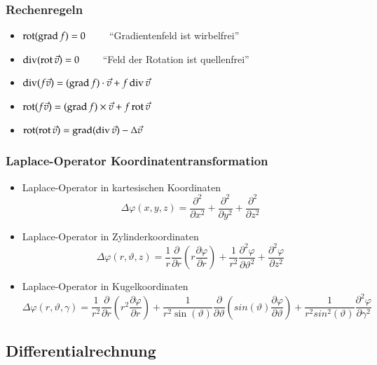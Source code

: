 \subsubsection{Rechenregeln}
\begin{itemize}
	\item $\operatorname{rot}(\operatorname{grad} f) = 0 \qquad $ ``Gradientenfeld ist wirbelfrei''
	\item $\operatorname{div}(\operatorname{rot} \vec{v}) = 0 \qquad $ ``Feld der Rotation ist quellenfrei''
	\item $\operatorname{div}(f\vec{v}) = (\operatorname{grad} f) \cdot \vec{v} + f \operatorname{div} \vec{v}$
	\item $\operatorname{rot}(f\vec{v}) = (\operatorname{grad} f) \times \vec{v} + f \operatorname{rot} \vec{v}$
	\item $\operatorname{rot}(\operatorname{rot} \vec{v}) = \operatorname{grad}(\operatorname{div} \vec{v}) - \Delta \vec{v}$
\end{itemize}
\subsubsection{Laplace-Operator Koordinatentransformation}
\begin{itemize}
	\item Laplace-Operator in kartesischen Koordinaten
	\[\Delta \varphi(x,y,z) = \frac{\partial^{2}}{\partial x^{2}}+\frac{\partial^{2}}{\partial y^{2}}+\frac{\partial^{2}}{\partial z^{2}}\]
	\item Laplace-Operator in Zylinderkoordinaten
	\[\Delta \varphi(r,\vartheta,z) = \frac{1}{r} \dfrac{\partial}{\partial r} \left(r \frac{\partial \varphi}{\partial r}\right) + \frac{1}{r^2}\frac{\partial^2 \varphi}{\partial \vartheta^2}+\dfrac{\partial^2 \varphi}{\partial z^2} \]
	\item Laplace-Operator in Kugelkoordinaten
	\[\Delta \varphi(r,\vartheta,\gamma) = \frac{1}{r^2} \dfrac{\partial}{\partial r} \left( r^2 \frac{\partial \varphi}{\partial r}\right) + \frac{1}{r^2 \sin(\vartheta)}\frac{\partial}{\partial \vartheta}\left(sin(\vartheta)\dfrac{\partial \varphi}{\partial \vartheta} \right) +\frac{1}{r^2 sin^2(\vartheta)}\dfrac{\partial^2 \varphi}{\partial \gamma^2}\]
\end{itemize}
\subsection{Differentialrechnung}
